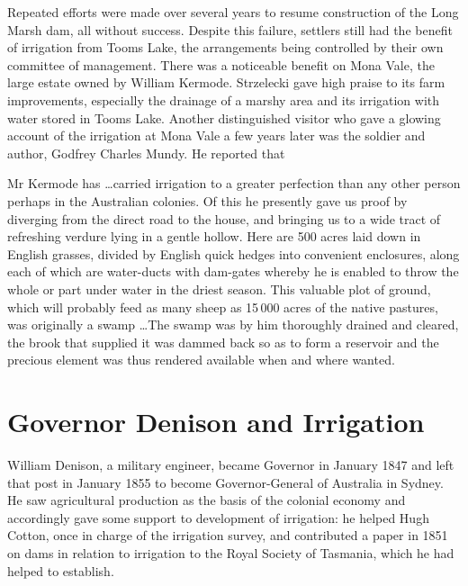 Repeated efforts were made over several years to resume construction
of the Long Marsh dam, all without success.
Despite this failure, settlers still had the benefit of irrigation
from Tooms Lake, the arrangements being controlled
by their own committee of management.  There was a noticeable benefit
on Mona Vale,  the large estate owned by
William Kermode.   Strzelecki  gave high praise to its farm improvements, especially the
drainage of a marshy area and its irrigation with
water stored in Tooms Lake.  Another distinguished
visitor who gave a glowing account of the irrigation at Mona Vale a
few years later was the soldier and author, Godfrey Charles
Mundy.  He reported that
\begin{Quote}
	Mr Kermode has \ldots carried irrigation to a greater
	perfection than any other person perhaps in the Australian
	colonies.  Of this he presently gave us proof by diverging
	from the direct road to the house, and bringing us to a wide
	tract of refreshing verdure lying in a gentle hollow.  Here
	are 500 acres laid down in English grasses, divided by English
	quick hedges into convenient enclosures, along each of which
	are water-ducts with dam-gates where\-by he is enabled to
	throw the whole or part under water in the driest season. This
	valuable plot of ground, which will probably feed as many
	sheep as 15\,000 acres of the native pastures,
	was originally a swamp \ldots The swamp was by him thoroughly
	drained and cleared, the brook that supplied it was dammed
	back so as to form a reservoir and the precious element was
	thus rendered available when and where wanted.
\end{Quote}

\section*{Governor Denison and Irrigation}

William Denison, a military engineer, became Governor
 in January 1847 and left that post in January
1855 to become Governor-General of Australia in Sydney.  He saw
agricultural production as the basis of the colonial economy and
accordingly gave some support to development of irrigation: he helped
Hugh Cotton,  once in charge of the irrigation
survey, and contributed a paper in 1851 on dams
in relation to irrigation to the Royal Society of Tasmania, which he
had helped to establish.

